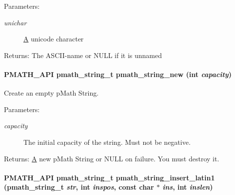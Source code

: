 \begin{Desc}
\item[Parameters:]
\begin{description}
\item[{\em unichar}]\hyperlink{class_a}{A} unicode character \end{description}
\end{Desc}
\begin{Desc}
\item[Returns:]The ASCII-name or NULL if it is unnamed \end{Desc}
\hypertarget{group__strings_g9f860fe571fcb87515b82ddc704c93ef}{
\paragraph[{pmath\_\-string\_\-new}]{\setlength{\rightskip}{0pt plus 5cm}PMATH\_\-API {\bf pmath\_\-string\_\-t} pmath\_\-string\_\-new (int {\em capacity})}\hfill}
\label{group__strings_g9f860fe571fcb87515b82ddc704c93ef}


Create an empty pMath String. 

\begin{Desc}
\item[Parameters:]
\begin{description}
\item[{\em capacity}]The initial capacity of the string. Must not be negative. \end{description}
\end{Desc}
\begin{Desc}
\item[Returns:]\hyperlink{class_a}{A} new pMath String or NULL on failure. You must destroy it. \end{Desc}
\hypertarget{group__strings_g0016e7daa5ca421a48b6d8bd3c5f7ff5}{
\paragraph[{pmath\_\-string\_\-insert\_\-latin1}]{\setlength{\rightskip}{0pt plus 5cm}PMATH\_\-API {\bf pmath\_\-string\_\-t} pmath\_\-string\_\-insert\_\-latin1 ({\bf pmath\_\-string\_\-t} {\em str}, \/  int {\em inspos}, \/  const char $\ast$ {\em ins}, \/  int {\em inslen})}\hfill}
\label{group__strings_g0016e7daa5ca421a48b6d8bd3c5f7ff5}


